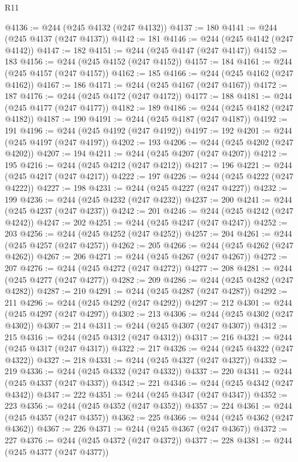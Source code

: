 \begin{lexlean}{R11}
\begin{coremodule}
{{{{{{{{{{{{{{{{{{{{{{{{{{{{{{{{{{{{{{{{{{{{{{{{{{{{{{{{{{{{{{{{{{{{{{{{{{{{{{{{{{@4136 := @244 (@245 @4132 (@247 @4132))
@4137 := 180
@4141 := @244 (@245 @4137 (@247 @4137))
@4142 := 181
@4146 := @244 (@245 @4142 (@247 @4142))
@4147 := 182
@4151 := @244 (@245 @4147 (@247 @4147))
@4152 := 183
@4156 := @244 (@245 @4152 (@247 @4152))
@4157 := 184
@4161 := @244 (@245 @4157 (@247 @4157))
@4162 := 185
@4166 := @244 (@245 @4162 (@247 @4162))
@4167 := 186
@4171 := @244 (@245 @4167 (@247 @4167))
@4172 := 187
@4176 := @244 (@245 @4172 (@247 @4172))
@4177 := 188
@4181 := @244 (@245 @4177 (@247 @4177))
@4182 := 189
@4186 := @244 (@245 @4182 (@247 @4182))
@4187 := 190
@4191 := @244 (@245 @4187 (@247 @4187))
@4192 := 191
@4196 := @244 (@245 @4192 (@247 @4192))
@4197 := 192
@4201 := @244 (@245 @4197 (@247 @4197))
@4202 := 193
@4206 := @244 (@245 @4202 (@247 @4202))
@4207 := 194
@4211 := @244 (@245 @4207 (@247 @4207))
@4212 := 195
@4216 := @244 (@245 @4212 (@247 @4212))
@4217 := 196
@4221 := @244 (@245 @4217 (@247 @4217))
@4222 := 197
@4226 := @244 (@245 @4222 (@247 @4222))
@4227 := 198
@4231 := @244 (@245 @4227 (@247 @4227))
@4232 := 199
@4236 := @244 (@245 @4232 (@247 @4232))
@4237 := 200
@4241 := @244 (@245 @4237 (@247 @4237))
@4242 := 201
@4246 := @244 (@245 @4242 (@247 @4242))
@4247 := 202
@4251 := @244 (@245 @4247 (@247 @4247))
@4252 := 203
@4256 := @244 (@245 @4252 (@247 @4252))
@4257 := 204
@4261 := @244 (@245 @4257 (@247 @4257))
@4262 := 205
@4266 := @244 (@245 @4262 (@247 @4262))
@4267 := 206
@4271 := @244 (@245 @4267 (@247 @4267))
@4272 := 207
@4276 := @244 (@245 @4272 (@247 @4272))
@4277 := 208
@4281 := @244 (@245 @4277 (@247 @4277))
@4282 := 209
@4286 := @244 (@245 @4282 (@247 @4282))
@4287 := 210
@4291 := @244 (@245 @4287 (@247 @4287))
@4292 := 211
@4296 := @244 (@245 @4292 (@247 @4292))
@4297 := 212
@4301 := @244 (@245 @4297 (@247 @4297))
@4302 := 213
@4306 := @244 (@245 @4302 (@247 @4302))
@4307 := 214
@4311 := @244 (@245 @4307 (@247 @4307))
@4312 := 215
@4316 := @244 (@245 @4312 (@247 @4312))
@4317 := 216
@4321 := @244 (@245 @4317 (@247 @4317))
@4322 := 217
@4326 := @244 (@245 @4322 (@247 @4322))
@4327 := 218
@4331 := @244 (@245 @4327 (@247 @4327))
@4332 := 219
@4336 := @244 (@245 @4332 (@247 @4332))
@4337 := 220
@4341 := @244 (@245 @4337 (@247 @4337))
@4342 := 221
@4346 := @244 (@245 @4342 (@247 @4342))
@4347 := 222
@4351 := @244 (@245 @4347 (@247 @4347))
@4352 := 223
@4356 := @244 (@245 @4352 (@247 @4352))
@4357 := 224
@4361 := @244 (@245 @4357 (@247 @4357))
@4362 := 225
@4366 := @244 (@245 @4362 (@247 @4362))
@4367 := 226
@4371 := @244 (@245 @4367 (@247 @4367))
@4372 := 227
@4376 := @244 (@245 @4372 (@247 @4372))
@4377 := 228
@4381 := @244 (@245 @4377 (@247 @4377))
}}}}}}}}}}}}}}}}}}}}}}}}}}}}}}}}}}}}}}}}}}}}}}}}}}}}}}}}}}}}}}}}}}}}}}}}}}}}}}}}}}
\end{coremodule}
\end{lexlean}
